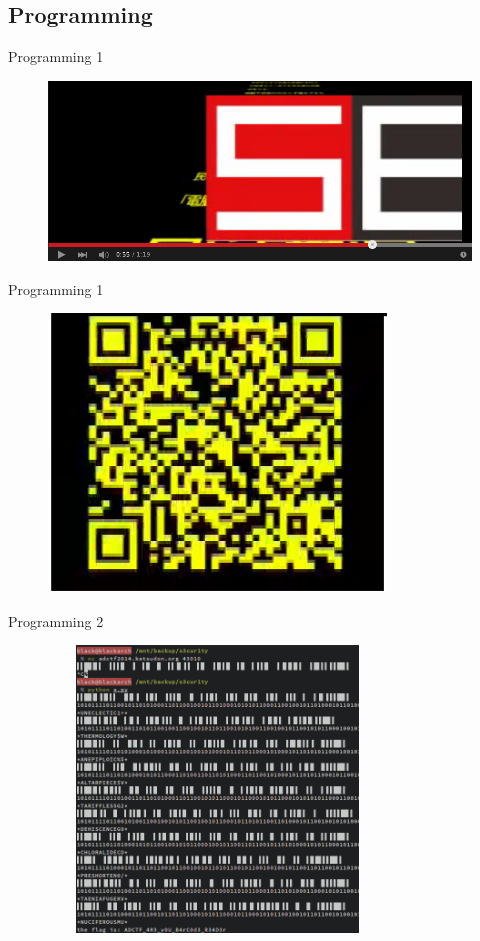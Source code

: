 \documentclass[compress]{beamer}
\begin{document}
\subsection{Programming}

\begin{frame}{Programming 1}
	\begin{figure}
		\centering
		\includegraphics[width=\textwidth]{images/p11.png}
	\end{figure}
\end{frame}

\begin{frame}{Programming 1}
	\begin{figure}
		\centering
		\includegraphics[width=0.8\textwidth]{images/p12.png}
	\end{figure}
\end{frame}

\begin{frame}{Programming 2}
	\begin{figure}
		\centering
		\includegraphics[width=0.8\textwidth,height=3in]{images/p21.png}
	\end{figure}
\end{frame}
\end{document}
